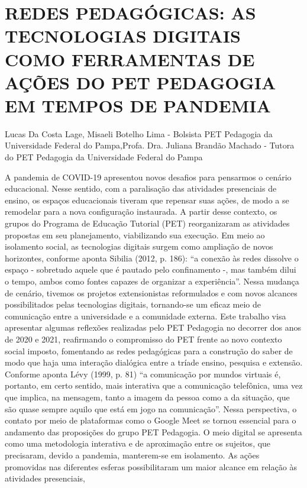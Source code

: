

\section{REDES PEDAGÓGICAS: AS TECNOLOGIAS DIGITAIS COMO FERRAMENTAS DE AÇÕES DO PET PEDAGOGIA EM TEMPOS DE PANDEMIA}

Lucas Da Costa Lage, Misaeli Botelho Lima - Bolsista PET Pedagogia da Universidade Federal do Pampa,Profa. Dra. Juliana Brandão Machado - Tutora do PET Pedagogia da Universidade Federal do Pampa

A pandemia de COVID-19 apresentou novos desafios para pensarmos o cenário
educacional. Nesse sentido, com a paralisação das atividades presenciais de ensino, os espaços
educacionais tiveram que repensar suas ações, de modo a se remodelar para a nova configuração
instaurada. A partir desse contexto, os grupos do Programa de Educação Tutorial (PET)
reorganizaram as atividades propostas em seu planejamento, viabilizando sua execução.
Em meio ao isolamento social, as tecnologias digitais surgem como ampliação de novos
horizontes, conforme aponta Sibilia (2012, p. 186): “a conexão às redes dissolve o espaço -
sobretudo aquele que é pautado pelo confinamento -, mas também dilui o tempo, ambos como
fontes capazes de organizar a experiência”. Nessa mudança de cenário, tivemos os projetos
extensionistas reformulados e com novos alcances possibilitados pelas tecnologias digitais,
tornando-se um eficaz meio de comunicação entre a universidade e a comunidade externa.
Este trabalho visa apresentar algumas reflexões realizadas pelo PET Pedagogia no
decorrer dos anos de 2020 e 2021, reafirmando o compromisso do PET frente ao novo contexto
social imposto, fomentando as redes pedagógicas para a construção do saber de modo que haja
uma interação dialógica entre a tríade ensino, pesquisa e extensão.
Conforme aponta Lévy (1999, p. 81) “a comunicação por mundos virtuais é, portanto,
em certo sentido, mais interativa que a comunicação telefônica, uma vez que implica, na
mensagem, tanto a imagem da pessoa como a da situação, que são quase sempre aquilo que está
em jogo na comunicação”. Nessa perspectiva, o contato por meio de plataformas como o Google
Meet se tornou essencial para o andamento das proposições do grupo PET Pedagogia.
O meio digital se apresenta como uma metodologia interativa e de aproximação entre os
sujeitos, que precisaram, devido a pandemia, manterem-se em isolamento. As ações promovidas
nas diferentes esferas possibilitaram um maior alcance em relação às atividades presenciais,
